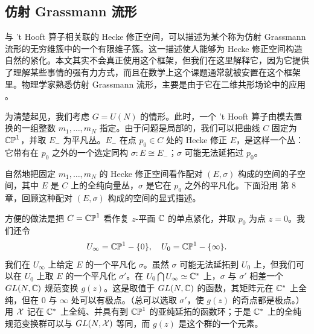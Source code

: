 
\subsection{仿射 Grassmann 流形}\label{sec:affgrass}

与 't Hooft 算子相关联的 Hecke 修正空间，可以描述为某个称为仿射 Grassmann 流形的无穷维簇中的一个有限维子簇。这一描述使人能够为 Hecke 修正空间构造自然的紧化。本文其实不会真正使用这个框架，但我们在这里解释它，因为它提供了理解某些事情的强有力方式，而且在数学上这个课题通常就被安置在这个框架里。物理学家熟悉仿射 Grassmann 流形，主要是由于它在二维共形场论中的应用 \cite{ref122}。

为清楚起见，我们考虑 $G=U(N)$ 的情形。此时，一个 't Hooft 算子由模去置换的一组整数 $m_1,\ldots,m_N$ 指定。由于问题是局部的，我们可以把曲线 $C$ 固定为 $\Bbb{CP}^1$，并取 $E_-$ 为平凡丛。$E_-$ 在点 $p_0\in C$ 处的 Hecke 修正 $E$，是这样一个丛：它带有在 $p_0$ 之外的一个选定同构 $\sigma:E\cong E_-$；$\sigma$ 可能无法延拓过 $p_0$。

自然地把固定 $m_1,\ldots,m_N$ 的 Hecke 修正空间看作配对 $(E,\sigma)$ 构成的空间的子空间，其中 $E$ 是 $C$ 上的全纯向量丛，$\sigma$ 是它在 $p_0$ 之外的平凡化。下面沿用 \cite{ref122} 第 8 章，回顾这种配对 $(E,\sigma)$ 构成的空间的显式描述。

方便的做法是把 $C=\Bbb{CP}^1$ 看作复 $z$-平面 $\CC$ 的单点紧化，并取 $p_0$ 为点 $z=0$。我们还令 %
\setcounter{equation}{27}
\begin{equation}\label{eq:jmj}
U_\infty=\Bbb{CP}^1-\{0\},\quad U_0=\Bbb{CP}^1-\{\infty\} .
\end{equation}
我们在 $U_\infty$ 上给定 $E$ 的一个平凡化 $\sigma$。虽然 $\sigma$ 可能无法延拓到 $U_0$ 上，但我们可以在 $U_0$ 上取 $E$ 的一个平凡化 $\sigma'$。在 $U_0\bigcap U_\infty\simeq\CC^*$ 上，$\sigma$ 与 $\sigma'$ 相差一个 $GL(N,\CC)$ 规范变换 $g(z)$。这是取值于 $GL(N,\CC)$ 的函数，其矩阵元在 $\CC^*$ 上全纯，但在 $0$ 与 $\infty$ 处可以有极点。（总可以选取 $\sigma'$，使 $g(z)$ 的奇点都是极点。）用 ${\cal X}$ 记在 $\CC^*$ 上全纯、并具有到 $\Bbb{CP}^1$ 的亚纯延拓的函数环；于是 $\CC^*$ 上的全纯规范变换群可以与 $GL(N,{\cal X})$ 等同，而 $g(z)$ 是这个群的一个元素。


